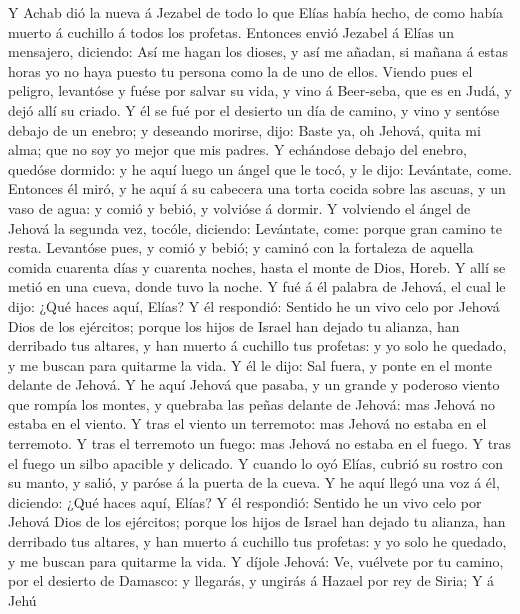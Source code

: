  Y Achab dió la nueva á Jezabel de todo lo que Elías había
hecho, de como había muerto á cuchillo á todos los profetas.
 Entonces envió Jezabel á Elías un mensajero, diciendo:
Así me hagan los dioses, y así me añadan, si mañana á estas horas yo no
haya puesto tu persona como la de uno de ellos.  Viendo
pues el peligro, levantóse y fuése por salvar su vida, y vino á
Beer-seba, que es en Judá, y dejó allí su criado.  Y él se
fué por el desierto un día de camino, y vino y sentóse debajo de un
enebro; y deseando morirse, dijo: Baste ya, oh Jehová, quita mi alma;
que no soy yo mejor que mis padres.  Y echándose debajo
del enebro, quedóse dormido: y he aquí luego un ángel que le tocó, y le
dijo: Levántate, come.  Entonces él miró, y he aquí á su
cabecera una torta cocida sobre las ascuas, y un vaso de agua: y comió y
bebió, y volvióse á dormir.  Y volviendo el ángel de
Jehová la segunda vez, tocóle, diciendo: Levántate, come: porque gran
camino te resta.  Levantóse pues, y comió y bebió; y
caminó con la fortaleza de aquella comida cuarenta días y cuarenta
noches, hasta el monte de Dios, Horeb.  Y allí se metió en
una cueva, donde tuvo la noche. Y fué á él palabra de Jehová, el cual le
dijo: ¿Qué haces aquí, Elías?  Y él respondió: Sentido he
un vivo celo por Jehová Dios de los ejércitos; porque los hijos de
Israel han dejado tu alianza, han derribado tus altares, y han muerto á
cuchillo tus profetas: y yo solo he quedado, y me buscan para quitarme
la vida.  Y él le dijo: Sal fuera, y ponte en el monte
delante de Jehová. Y he aquí Jehová que pasaba, y un grande y poderoso
viento que rompía los montes, y quebraba las peñas delante de Jehová:
mas Jehová no estaba en el viento. Y tras el viento un terremoto: mas
Jehová no estaba en el terremoto.  Y tras el terremoto un
fuego: mas Jehová no estaba en el fuego. Y tras el fuego un silbo
apacible y delicado.  Y cuando lo oyó Elías, cubrió su
rostro con su manto, y salió, y paróse á la puerta de la cueva. Y he
aquí llegó una voz á él, diciendo: ¿Qué haces aquí, Elías?
 Y él respondió: Sentido he un vivo celo por Jehová Dios
de los ejércitos; porque los hijos de Israel han dejado tu alianza, han
derribado tus altares, y han muerto á cuchillo tus profetas: y yo solo
he quedado, y me buscan para quitarme la vida.  Y díjole
Jehová: Ve, vuélvete por tu camino, por el desierto de Damasco: y
llegarás, y ungirás á Hazael por rey de Siria;  Y á Jehú
